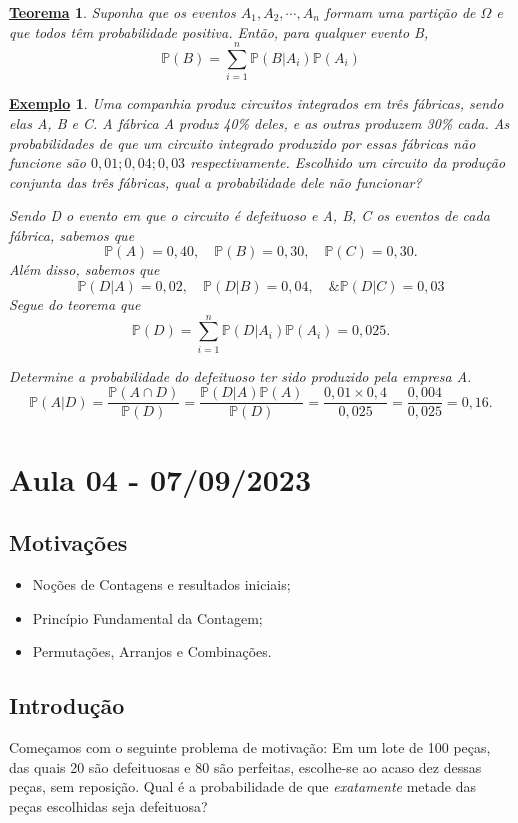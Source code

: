 \documentclass{article}
\newtheorem*{theorem*}{\underline{Teorema}}
\newtheorem{example}{\underline{Exemplo}}
\begin{document}
\begin{theorem*}
  Suponha que os eventos \(A_{1}, A_{2}, \cdots, A_{n}\) formam uma partição de \(\Omega \) e que todos têm probabilidade positiva. Então, para qualquer evento B, 
  \[
    \mathbb{P}(B) = \sum\limits_{i=1}^{n}\mathbb{P}(B|A_{i})\mathbb{P}(A_{i})
  \]
\end{theorem*}
\begin{example}
  Uma companhia produz circuitos integrados em três fábricas, sendo elas A, B e C. A fábrica A produz 40\% deles, e as outras produzem 30\% cada. As probabilidades de que um circuito integrado produzido por essas fábricas não funcione são 
  \(0,01; 0,04; 0,03\) respectivamente. Escolhido um circuito da produção conjunta das três fábricas, qual a probabilidade dele não funcionar? 

  Sendo D o evento em que o circuito é defeituoso e A, B, C os eventos de cada fábrica, sabemos que 
  \[
    \mathbb{P}(A) = 0,40,\quad \mathbb{P}(B) = 0,30,\quad \mathbb{P}(C) = 0,30.
  \]
  Além disso, sabemos que 
  \[
    \mathbb{P}(D|A) = 0,02,\quad \mathbb{P}(D|B) = 0,04,\quad \& \mathbb{P}(D|C) = 0,03
  \]
  Segue do teorema que 
  \[
    \mathbb{P}(D) = \sum\limits_{i=1}^{n}\mathbb{P}(D|A_{i})\mathbb{P}(A_{i}) = 0,025.
  \]

  Determine a probabilidade do defeituoso ter sido produzido pela empresa A. 
  \[
    \mathbb{P}(A|D) = \frac{\mathbb{P}(A\cap D)}{\mathbb{P}(D)} = \frac{\mathbb{P}(D|A)\mathbb{P}(A)}{\mathbb{P}(D)} = \frac{0,01\times 0,4}{0,025} = \frac{0,004}{0,025} = 0,16.
  \]
\end{example}
\newpage

\section{Aula 04 - 07/09/2023}
\subsection{Motivações}
\begin{itemize}
  \item Noções de Contagens e resultados iniciais;
  \item Princípio Fundamental da Contagem;
  \item Permutações, Arranjos e Combinações.
\end{itemize}
\subsection{Introdução}
Começamos com o seguinte problema de motivação: Em um lote de 100 peças, das quais
20 são defeituosas e 80 são perfeitas, escolhe-se ao acaso dez dessas peças, sem reposição.
Qual é a probabilidade de que \textit{exatamente} metade das peças escolhidas seja defeituosa?
\end{document}
